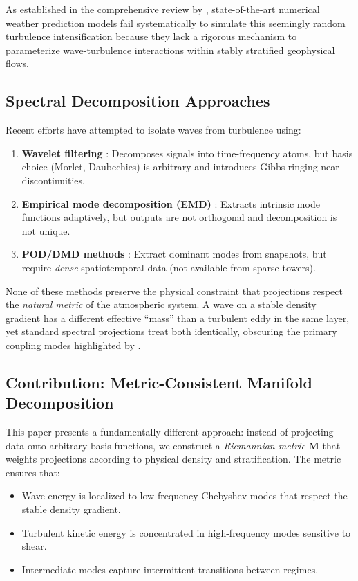 \documentclass[11pt,a4paper]{article}
\begin{document}
As established in the comprehensive review by \citet{Sun2015}, state-of-the-art numerical weather prediction models fail systematically to simulate this seemingly random turbulence intensification because they lack a rigorous mechanism to parameterize wave-turbulence interactions within stably stratified geophysical flows.

\subsection{Spectral Decomposition Approaches}

Recent efforts have attempted to isolate waves from turbulence using:
\begin{enumerate}
  \item \textbf{Wavelet filtering} \citep{Vosper2006, Sun2015}: Decomposes signals into time-frequency atoms, but basis choice (Morlet, Daubechies) is arbitrary and introduces Gibbs ringing near discontinuities.
  \item \textbf{Empirical mode decomposition (EMD)} \citep{Huang1998}: Extracts intrinsic mode functions adaptively, but outputs are not orthogonal and decomposition is not unique.
  \item \textbf{POD/DMD methods} \citep{Schmid2010}: Extract dominant modes from snapshots, but require \emph{dense} spatiotemporal data (not available from sparse towers).
\end{enumerate}

None of these methods preserve the physical constraint that projections respect the \emph{natural metric} of the atmospheric system. A wave on a stable density gradient has a different effective ``mass'' than a turbulent eddy in the same layer, yet standard spectral projections treat both identically, obscuring the primary coupling modes highlighted by \citet{Sun2015}.

\subsection{Contribution: Metric-Consistent Manifold Decomposition}

This paper presents a fundamentally different approach: instead of projecting data onto arbitrary basis functions, we construct a \emph{Riemannian metric} $\mathbf{M}$ that weights projections according to physical density and stratification. The metric ensures that:
\begin{itemize}
  \item Wave energy is localized to low-frequency Chebyshev modes that respect the stable density gradient.
  \item Turbulent kinetic energy is concentrated in high-frequency modes sensitive to shear.
  \item Intermediate modes capture intermittent transitions between regimes.
\end{itemize}
\end{document}
